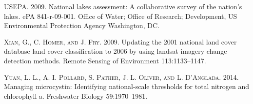 \documentclass[11pt,]{article}
\begin{document}
\textsc{USEPA}. 2009. National lakes assessment: A collaborative survey
of the nation's lakes. ePA 841-r-09-001. Office of Water; Office of
Research; Development, US Environmental Protection Agency Washington,
DC.

\textsc{Xian, G., C. Homer, and J. Fry}. 2009. Updating the 2001
national land cover database land cover classification to 2006 by using
landsat imagery change detection methods. Remote Sensing of Environment
113:1133--1147.

\textsc{Yuan, L. L., A. I. Pollard, S. Pather, J. L. Oliver, and L.
D'Anglada}. 2014. Managing microcystin: Identifying national-scale
thresholds for total nitrogen and chlorophyll a. Freshwater Biology
59:1970--1981.
\end{document}
